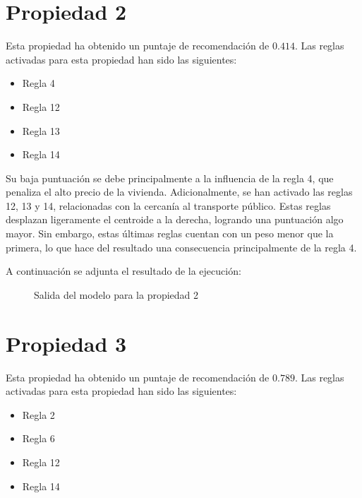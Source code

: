 \documentclass[12pt]{report} %
\begin{document}
    \section{Propiedad 2}
    
    Esta propiedad ha obtenido un puntaje de recomendación de $0.414$. Las reglas activadas para esta propiedad han sido las siguientes: 
    \begin{itemize}
        \item Regla 4
        \item Regla 12
        \item Regla 13
        \item Regla 14
    \end{itemize}
    Su baja puntuación se debe principalmente a la influencia de la regla 4,
    que penaliza el alto precio de la vivienda. Adicionalmente, se han activado
    las reglas 12, 13 y 14, relacionadas con la cercanía al transporte público.
    Estas reglas desplazan ligeramente el centroide a la derecha, logrando una
    puntuación algo mayor. Sin embargo, estas últimas reglas cuentan con un
    peso menor que la primera, lo que hace del resultado una consecuencia
    principalmente de la regla 4.

    A continuación se adjunta el resultado de la ejecución:
    \begin{figure}[H]
        \centering
        \caption{Salida del modelo para la propiedad 2}
    \end{figure}

    \section{Propiedad 3}
    Esta propiedad ha obtenido un puntaje de recomendación de $0.789$. Las reglas activadas para esta propiedad han sido las siguientes: 
    \begin{itemize}
        \item Regla 2
        \item Regla 6
        \item Regla 12
        \item Regla 14
    \end{itemize}
\end{document}
